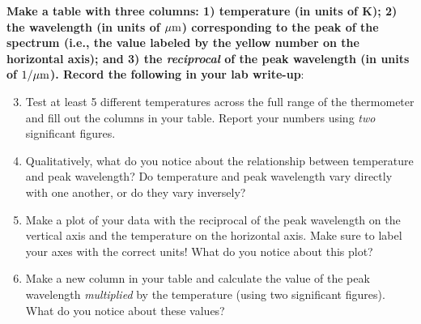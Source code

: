 \documentclass[11pt]{article}
\begin{document}
\bigskip
\textbf{Make a table with three columns: 1) temperature (in units of K); 2) the wavelength (in units of $\rm \mu m$) corresponding to the peak of the spectrum (i.e., the value labeled by the yellow number on the horizontal axis); and 3) the \emph{reciprocal} of the peak wavelength (in units of $\rm 1/\mu m$). Record the following in your lab write-up}: 
\begin{enumerate}
    \setcounter{enumi}{2}
    
    \item Test at least 5 different temperatures across the full range of the thermometer and fill out the columns in your table. Report your numbers using \emph{two} significant figures.
    \item Qualitatively, what do you notice about the relationship between temperature and peak wavelength? Do temperature and peak wavelength vary directly with one another, or do they vary inversely?
    \item Make a plot of your data with the reciprocal of the peak wavelength on the vertical axis and the temperature on the horizontal axis. Make sure to label your axes with the correct units! What do you notice about this plot? 
    \item Make a new column in your table and calculate the value of the peak wavelength \emph{multiplied} by the temperature (using two significant figures). What do you notice about these values? 
\end{enumerate}
\end{document}

